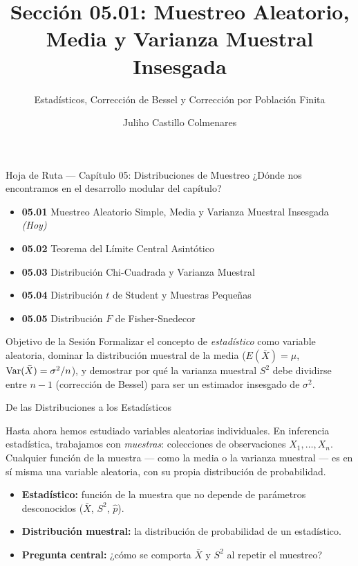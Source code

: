 \documentclass[10pt, aspectratio=169]{beamer}
\title[Estadísticos y Varianza Insesgada]{Sección 05.01: Muestreo Aleatorio, Media y Varianza Muestral Insesgada}
\subtitle{Estadísticos, Corrección de Bessel y Corrección por Población Finita}
\author[J. Castillo Colmenares]{Juliho Castillo Colmenares}
\institute{Tecnológico de Monterrey}
\date{\vspace{-1.2cm}}
\begin{document}
\begin{frame}[plain]
  \vspace{-0.8cm}
  \titlepage
\end{frame}

\begin{frame}{Hoja de Ruta --- Capítulo 05: Distribuciones de Muestreo}
  \footnotesize
  ¿Dónde nos encontramos en el desarrollo modular del capítulo? \pause
  \begin{itemize}\itemsep=0.08em
    \item \textbf{05.01} Muestreo Aleatorio Simple, Media y Varianza Muestral Insesgada \emph{(Hoy)} \pause
    \item \textbf{05.02} Teorema del Límite Central Asintótico \pause
    \item \textbf{05.03} Distribución Chi-Cuadrada y Varianza Muestral \pause
    \item \textbf{05.04} Distribución $t$ de Student y Muestras Pequeñas \pause
    \item \textbf{05.05} Distribución $F$ de Fisher-Snedecor
  \end{itemize}
  \vspace{-0.05cm}
  \begin{block}{Objetivo de la Sesión}
    Formalizar el concepto de \emph{estadístico} como variable aleatoria, dominar la distribución muestral de la media ($E(\bar{X})=\mu$, $\operatorname{Var}(\bar{X})=\sigma^2/n$), y demostrar por qué la varianza muestral $S^2$ debe dividirse entre $n-1$ (corrección de Bessel) para ser un estimador insesgado de $\sigma^2$.
  \end{block}
\end{frame}

\begin{frame}{De las Distribuciones a los Estadísticos}
  \footnotesize
  \begin{motivacion}
    Hasta ahora hemos estudiado variables aleatorias individuales. En inferencia estadística, trabajamos con \emph{muestras}: colecciones de observaciones $X_1, \ldots, X_n$. Cualquier función de la muestra --- como la media o la varianza muestral --- es en sí misma una variable aleatoria, con su propia distribución de probabilidad.
  \end{motivacion}

  \vspace{0.15cm}
  \pause
  \begin{itemize}\itemsep=0.1cm
    \item \textbf{Estadístico:} función de la muestra que no depende de parámetros desconocidos ($\bar{X}$, $S^2$, $\hat{p}$). \pause
    \item \textbf{Distribución muestral:} la distribución de probabilidad de un estadístico. \pause
    \item \textbf{Pregunta central:} ¿cómo se comporta $\bar{X}$ y $S^2$ al repetir el muestreo?
  \end{itemize}
\end{frame}
\end{document}

